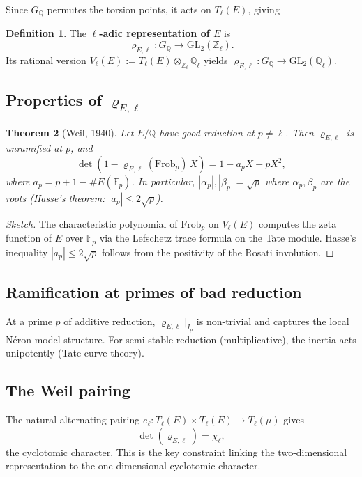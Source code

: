 \documentclass[a4paper,12pt]{amsart}
\newtheorem{theorem}{Theorem}[section]
\theoremstyle{definition}
\newtheorem{definition}[theorem]{Definition}
\theoremstyle{remark}
\newcommand{\Q}{\mathbb{Q}}
\newcommand{\Zl}{\mathbb{Z}_\ell}
\newcommand{\Ql}{\mathbb{Q}_\ell}
\newcommand{\Fp}{\mathbb{F}_p}
\newcommand{\GL}{\mathrm{GL}}
\newcommand{\Frob}{\mathrm{Frob}}
\newcommand{\Tl}{T_\ell}
\begin{document}
Since $G_\Q$ permutes the torsion points, it acts on $\Tl(E)$, giving

\begin{definition}
The \textbf{$\ell$-adic representation of $E$} is
\[
  \varrho_{E,\ell}\colon G_\Q \to \GL_2(\Zl).
\]
Its rational version $V_\ell(E) := \Tl(E) \otimes_{\Zl} \Ql$ yields
$\varrho_{E,\ell}\colon G_\Q \to \GL_2(\Ql)$.
\end{definition}

\subsection{Properties of $\varrho_{E,\ell}$}

\begin{theorem}[Weil, 1940]
\label{thm:weil-hasse}
Let $E/\Q$ have good reduction at $p \neq \ell$. Then $\varrho_{E,\ell}$ is
unramified at $p$, and
\[
  \det(1 - \varrho_{E,\ell}(\Frob_p)\,X) = 1 - a_p X + p X^2,
\]
where $a_p = p + 1 - \#E(\Fp)$. In particular,
$|\alpha_p|, |\beta_p| = \sqrt{p}$ where $\alpha_p, \beta_p$ are the roots
(Hasse's theorem: $|a_p| \leq 2\sqrt{p}$).
\end{theorem}

\begin{proof}[Sketch]
The characteristic polynomial of $\Frob_p$ on $V_\ell(E)$ computes the zeta
function of $E$ over $\Fp$ via the Lefschetz trace formula on the Tate module.
Hasse's inequality $|a_p| \leq 2\sqrt{p}$ follows from the positivity of the
Rosati involution.
\end{proof}

\subsection{Ramification at primes of bad reduction}

At a prime $p$ of additive reduction, $\varrho_{E,\ell}|_{I_p}$ is non-trivial and
captures the local Néron model structure. For semi-stable reduction (multiplicative),
the inertia acts unipotently (Tate curve theory).

\subsection{The Weil pairing}

The natural alternating pairing $e_\ell\colon \Tl(E) \times \Tl(E) \to \Tl(\mu)$
gives
\[
  \det(\varrho_{E,\ell}) = \chi_\ell,
\]
the cyclotomic character. This is the key constraint linking the two-dimensional
representation to the one-dimensional cyclotomic character.
\end{document}
